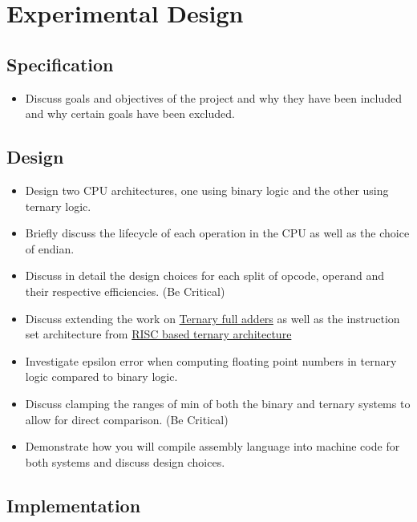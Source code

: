 \documentclass[12pt]{article}
\begin{document}
\section{Experimental Design}

\subsection{Specification}

\begin{itemize}
    \item Discuss goals and objectives of the project and why they have been included and why certain goals have been excluded.
\end{itemize}

\subsection{Design}

\begin{itemize}
    \item Design two CPU architectures, one using binary logic and the other using ternary logic.
    \item Briefly discuss the lifecycle of each operation in the CPU as well as the choice of endian.
    \item Discuss in detail the design choices for each split of opcode, operand and their respective efficiencies. (Be Critical)
    \item Discuss extending the work on \href{https://www.mdpi.com/2072-666X/14/5/1064}{Ternary full adders} 
    as well as the instruction set architecture from \href{https://ieeexplore.ieee.org/stamp/stamp.jsp?tp=&arnumber=9774584&tag=1&tag=1&tag=1URL}{RISC based ternary architecture}
    \item Investigate epsilon error when computing floating point numbers in ternary logic compared to binary logic.
    \item Discuss clamping the ranges of min of both the binary and ternary systems to allow for direct comparison. (Be Critical)
    \item Demonstrate how you will compile assembly language into machine code for both systems and discuss design choices.
\end{itemize}

\subsection{Implementation}
\end{document}
